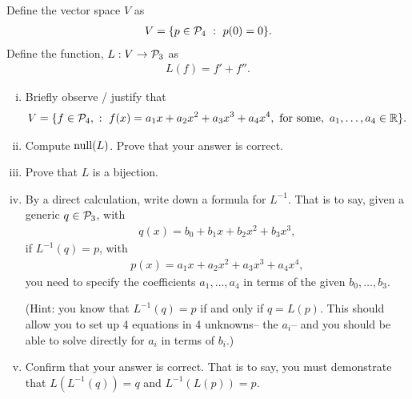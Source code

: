\begin{question}\label{que:PrimePlusPrimePrime}
    \normalfont
    Define the vector space $V$ as
    \begin{align*}
        V = \{ p\in\P_4\ :\ p(0)=0 \}.
    \end{align*}
    Define the function, $L:V\to\P_3$ as
    \begin{align*}
        L(f) = f'+f''.
    \end{align*}

    \begin{enumerate}[(i)]
        \item Briefly observe / justify that
              \begin{align*}
                  V = \{ f\in\P_4,\ :\ f(x) = a_1x + a_2x^2 +a_3x^3 + a_4 x^4,\ \text{for some},\ a_1,\dots,a_4 \in\real\}.
              \end{align*}

        \item Compute $\NullLA(L)$.  Prove that your answer is correct.

        \item Prove that $L$ is a bijection.

        \item By a direct calculation, write down a formula for $L^{-1}$.  That is to say, given a generic $q\in \P_3$, with
              \begin{align*}
                  q(x)= b_0 + b_1x + b_2x^2 + b_3x^3,
              \end{align*}
              if $L^{-1}(q)=p$, with
              \begin{align*}
                  p(x) = a_1x + a_2x^2 +a_3x^3 + a_4 x^4,
              \end{align*}
              you need to specify the coefficients $a_1,\dots, a_4$ in terms of the given $b_0,\dots, b_3$.

              (Hint: you know that $L^{-1}(q)=p$ if and only if $q=L(p)$.  This should allow you to set up 4 equations in 4 unknowns-- the $a_i$-- and you should be able to solve directly for $a_i$ in terms of $b_i$.)

        \item Confirm that your answer is correct.  That is to say, you must demonstrate that $L(L^{-1}(q))=q$ and $L^{-1}(L(p))=p$.

    \end{enumerate}
\end{question}

